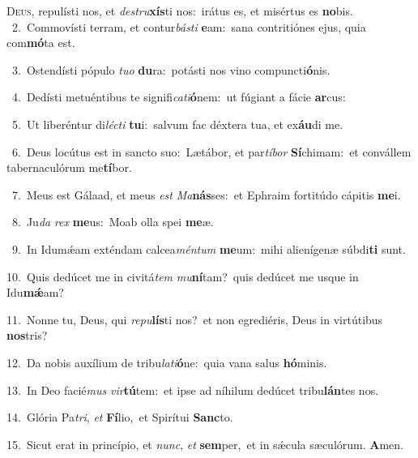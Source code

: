 \lettrine{\initial\textcolor{\initialcolor}{D}}{eus,} repulísti nos, et \textit{de}\-\textit{stru}\textbf{xís}ti nos:~\star irátus es, et misértus es \textbf{no}\-bis.\\
{\numbfont\textcolor{\numbcolor}{~2.}}~Commovísti terram, et contur\-\textit{bás}\-\textit{ti} \textbf{e}\-am:~\star sana contritiónes ejus, quia com\-\textbf{mó}\-ta est.\par
{\numbfont\textcolor{\numbcolor}{~3.}}~Ostendísti pópulo \textit{tu}\-\textit{o} \textbf{du}\-ra:~\star potásti nos vino compuncti\-\textbf{ó}\-nis.\par
{\numbfont\textcolor{\numbcolor}{~4.}}~Dedísti metuéntibus te signifi\-\textit{ca}\-\textit{ti}\textbf{ó}nem:~\star ut fúgiant a fácie \textbf{ar}\-cus:\par
{\numbfont\textcolor{\numbcolor}{~5.}}~Ut liberéntur di\-\textit{léc}\-\textit{ti} \textbf{tu}\-i:~\star salvum fac déxtera tua, et ex\-\textbf{áu}\-di me.\par
{\numbfont\textcolor{\numbcolor}{~6.}}~Deus locútus est in sancto suo:~\dagger Lætábor, et par\-\textit{tí}\-\textit{bor} \textbf{Sí}\-chimam:~\star et convállem tabernaculórum me\-\textbf{tí}\-bor.\par
{\numbfont\textcolor{\numbcolor}{~7.}}~Meus est Gálaad, et meus \textit{est} \textit{Ma}\-\textbf{nás}ses:~\star et Ephraim fortitúdo cápitis \textbf{me}\-i.\par
{\numbfont\textcolor{\numbcolor}{~8.}}~Ju\textit{da} \textit{rex} \textbf{me}\-us:~\star Moab olla spei \textbf{me}\-æ.\par
{\numbfont\textcolor{\numbcolor}{~9.}}~In Idumǽam exténdam calcea\-\textit{mén}\-\textit{tum} \textbf{me}\-um:~\star mihi alienígenæ súbdi\textbf{ti} sunt.\par
{\numbfont\textcolor{\numbcolor}{10.}}~Quis dedúcet me in civitá\textit{tem} \textit{mu}\-\textbf{ní}tam?~\star quis dedúcet me usque in Idu\-\textbf{mǽ}\-am?\par
{\numbfont\textcolor{\numbcolor}{11.}}~Nonne tu, Deus, qui \textit{re}\-\textit{pu}\textbf{lís}ti nos?~\star et non egrediéris, Deus in virtútibus \textbf{nos}\-tris?\par
{\numbfont\textcolor{\numbcolor}{12.}}~Da nobis auxílium de tribu\-\textit{la}\-\textit{ti}\textbf{ó}ne:~\star quia vana salus \textbf{hó}\-minis.\par
{\numbfont\textcolor{\numbcolor}{13.}}~In Deo facié\textit{mus} \textit{vir}\-\textbf{tú}tem:~\star et ipse ad níhilum dedúcet tribu\-\textbf{lán}\-tes nos.\par
{\numbfont\textcolor{\numbcolor}{14.}}~Glória Pa\-\textit{tri}\-, \textit{et} \textbf{Fí}\-lio,~\star et Spirítui \textbf{Sanc}\-to.\par
{\numbfont\textcolor{\numbcolor}{15.}}~Sicut erat in princípio, et \textit{nunc}\-, \textit{et} \textbf{sem}\-per,~\star et in sǽcula sæculórum. \textbf{A}\-men.\par
